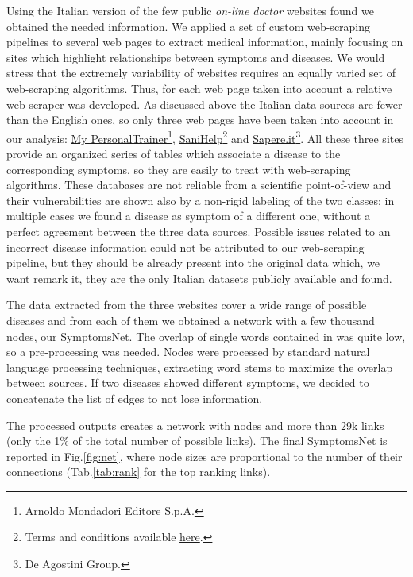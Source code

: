 \documentclass{standalone}
\begin{document}
Using the Italian version of the few public \emph{on-line doctor} websites found we obtained the needed information.
We applied a set of custom \textsf{web-scraping} pipelines to several web pages to extract medical information, mainly focusing on sites which highlight relationships between symptoms and diseases.
We would stress that the extremely variability of websites requires an equally varied set of \textsf{web-scraping} algorithms.
Thus, for each web page taken into account a relative web-scraper was developed.
As discussed above the Italian data sources are fewer than the English ones, so only three web pages have been taken into account in our analysis: \href{https://m.my-personaltrainer.it/}{My PersonalTrainer}\footnote{
  Arnoldo Mondadori Editore S.p.A.
}, \href{http://www.sanihelp.it/}{SaniHelp}\footnote{
  Terms and conditions available \href{https://www.iubenda.com/terms-and-conditions/210132}{here}.
} and \href{http://www.sapere.it/}{Sapere.it}\footnote{
  De Agostini Group.
}.
All these three sites provide an organized series of tables which associate a disease to the corresponding symptoms, so they are easily to treat with \textsf{web-scraping} algorithms.
These databases are not reliable from a scientific point-of-view and their vulnerabilities are shown also by a non-rigid labeling of the two classes: in multiple cases we found a disease as symptom of a different one, without a perfect agreement between the three data sources.
Possible issues related to an incorrect disease information could not be attributed to our \textsf{web-scraping} pipeline, but they should be already present into the original data which, we want remark it, they are the only Italian datasets publicly available and found.

The data extracted from the three websites cover a wide range of possible diseases and from each of them we obtained a network with a few thousand nodes, our \textsf{SymptomsNet}.
The overlap of single words contained in  was quite low, so a pre-processing was needed.
Nodes were processed by standard natural language processing techniques, extracting word stems to maximize the overlap between sources.
If two diseases showed different symptoms, we decided to concatenate the list of edges to not lose information.

The processed outputs creates a network with  nodes and more than 29k links (only the 1\% of the total number of possible links).
The final \textsf{SymptomsNet} is reported in Fig.\ref{fig:net}, where node sizes are proportional to the number of their connections (Tab.\ref{tab:rank} for the top ranking links).
\end{document}
